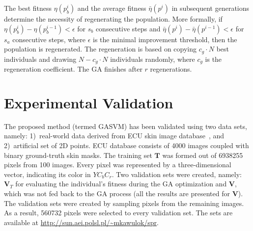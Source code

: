 \documentclass{llncs}
\begin{document}
 The best fitness $\eta(p^{i}_{b})$ and the average fitness $\bar{\eta}(p^{i})$ in subsequent generations determine the necessity of regenerating the population. More formally, if $\eta(p^{i}_{b})-\eta(p^{i-1}_{b}) < \epsilon$ for $s_{b}$ consecutive steps and $\bar{\eta}(p^{i})-\bar{\eta}(p^{i-1}) < \epsilon$ for $s_{a}$ consecutive steps, where $\epsilon$ is the minimal improvement threshold, then the population is regenerated. The regeneration is based on copying $c_{g}\cdot N$ best individuals and drawing $N-c_{g}\cdot N$ individuals randomly, where $c_{g}$ is the regeneration coefficient. The GA finishes after $r$ regenerations.

\section{Experimental Validation} \label{sec:exp}

The proposed method (termed GASVM) has been validated using two data
sets, namely: 1)~real-world data derived from ECU skin image
database~\cite{Phung2003}, and 2)~artificial set of 2D points. ECU
database consists of 4000 images coupled with binary ground-truth
skin masks. The training set $\bm{T}$ was formed out of 6938255
pixels from 100 images. Every pixel was represented by a
three-dimensional vector, indicating its color in $YC_bC_r$. Two
validation sets were created, namely: $\bm{V}_T$ for evaluating the
individual's fitness during the GA optimization and $\bm{V}$, which was
not fed back to the GA process (all the results are presented for
$\bm{V}$). The validation sets were created by sampling pixels from
the remaining images. As a result, 560732 pixels were selected to
every validation set. The sets are available at
\url{http://sun.aei.polsl.pl/~mkawulok/spr}.
\end{document}
